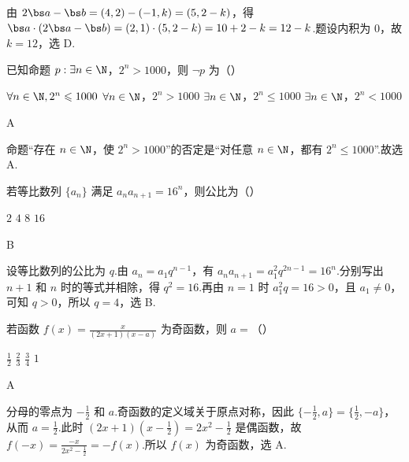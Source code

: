 \begin{solution}
由 \(2\bs a-\bs b=(4,2)-(-1,k)=(5,2-k)\)，得
\(\bs a\cdot(2\bs a-\bs b)=(2,1)\cdot(5,2-k)=10+2-k=12-k\).题设内积为 \(0\)，故 \(k=12\)，选 D.
\end{solution}

\begin{problem}
已知命题 \(p: \exists n \in \N\)，\(2^n > 1000\)，则 \(\neg p\) 为（\quad）

\choices
    {\(\forall n\in \N,2^{n}\leqslant 1000\)}
    {\(\forall n\in \N\)，\(2^n >1000\)}
    {\(\exists n\in \N\)，\(2^n\leqslant 1000\)}
    {\(\exists n\in \N\)，\(2^n < 1000\)}
\end{problem}

\begin{answer}
A
\end{answer}

\begin{solution}
命题“存在 \(n\in\N\)，使 \(2^n>1000\)”的否定是“对任意 \(n\in\N\)，都有 \(2^n\leqslant1000\)”.故选 A.
\end{solution}

\begin{problem}
若等比数列 \(\{a_{n}\}\) 满足 \(a_{n}a_{n + 1} = 16^{n}\)，则公比为（\quad）

\choices
    {\(2\)}
    {\(4\)}
    {\(8\)}
    {\(16\)}
\end{problem}

\begin{answer}
B
\end{answer}

\begin{solution}
设等比数列的公比为 \(q\).由 \(a_n=a_1q^{n-1}\)，有
\(\displaystyle a_na_{n+1}=a_1^2q^{2n-1}=16^n\).分别写出 \(n+1\) 和 \(n\) 时的等式并相除，得 \(q^2=16\).再由 \(n=1\) 时 \(a_1^2q=16>0\)，且 \(a_1\neq0\)，可知 \(q>0\)，所以 \(q=4\)，选 B.
\end{solution}

\begin{problem}
若函数 \( f(x) = \frac{x}{(2x + 1)(x - a)} \) 为奇函数，则 \( a = \)（\quad）

\choices
    {\(\frac{1}{2}\)}
    {\( \frac{2}{3} \)}
    {\(\frac{3}{4}\)}
    {\(1\)}
\end{problem}

\begin{answer}
A
\end{answer}

\begin{solution}
分母的零点为 \(-\tfrac12\) 和 \(a\).奇函数的定义域关于原点对称，因此
\(\{-\tfrac12,a\}=\{\tfrac12,-a\}\)，从而 \(a=\tfrac12\).此时
\(\displaystyle (2x+1)(x-\tfrac12)=2x^2-\tfrac12\) 是偶函数，故
\(\displaystyle f(-x)=\frac{-x}{2x^2-\tfrac12}=-f(x)\).所以 \(f(x)\) 为奇函数，选 A.
\end{solution}


